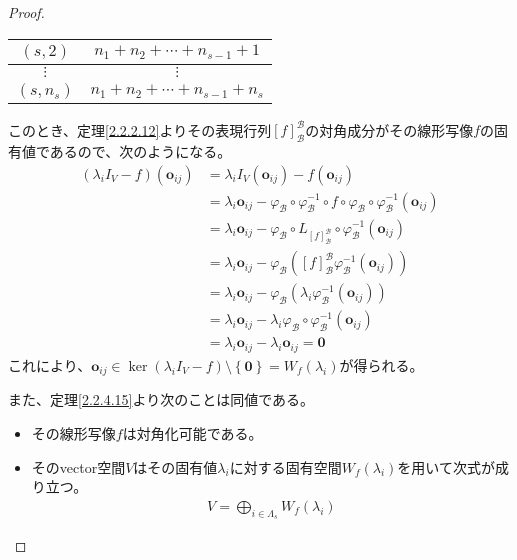 \documentclass[dvipdfmx]{jsarticle}
\begin{document}
\begin{proof}
\begin{longtable}[c]{|c|c|}
  \hline
  $(s,2)$ & $n_{1} + n_{2} + \cdots + n_{s - 1} + 1$ \\
  \hline
  $\vdots$ & $\vdots$ \\
  \hline
  $\left( s,n_{s} \right)$ & $n_{1} + n_{2} + \cdots + n_{s - 1} + n_{s}$ \\
  \hline
\end{longtable}
このとき、定理\ref{2.2.2.12}よりその表現行列$[ f]_{\mathcal{B}}^{\mathcal{B}}$の対角成分がその線形写像$f$の固有値であるので、次のようになる。
\begin{align*}
\left( \lambda_{i}I_{V} - f \right)\left( \mathbf{o}_{ij} \right) &= \lambda_{i}I_{V}\left( \mathbf{o}_{ij} \right) - f\left( \mathbf{o}_{ij} \right)\\
&= \lambda_{i}\mathbf{o}_{ij} - \varphi_{\mathcal{B}} \circ \varphi_{\mathcal{B}}^{- 1} \circ f \circ \varphi_{\mathcal{B}} \circ \varphi_{\mathcal{B}}^{- 1}\left( \mathbf{o}_{ij} \right)\\
&= \lambda_{i}\mathbf{o}_{ij} - \varphi_{\mathcal{B}} \circ L_{[ f]_{\mathcal{B}}^{\mathcal{B}}} \circ \varphi_{\mathcal{B}}^{- 1}\left( \mathbf{o}_{ij} \right)\\
&= \lambda_{i}\mathbf{o}_{ij} - \varphi_{\mathcal{B}}\left( [ f]_{\mathcal{B}}^{\mathcal{B}}\varphi_{\mathcal{B}}^{- 1}\left( \mathbf{o}_{ij} \right) \right)\\
&= \lambda_{i}\mathbf{o}_{ij} - \varphi_{\mathcal{B}}\left( \lambda_{i}\varphi_{\mathcal{B}}^{- 1}\left( \mathbf{o}_{ij} \right) \right)\\
&= \lambda_{i}\mathbf{o}_{ij} - \lambda_{i}\varphi_{\mathcal{B}} \circ \varphi_{\mathcal{B}}^{- 1}\left( \mathbf{o}_{ij} \right)\\
&= \lambda_{i}\mathbf{o}_{ij} - \lambda_{i}\mathbf{o}_{ij} = \mathbf{0}
\end{align*}
これにより、$\mathbf{o}_{ij} \in \ker\left( \lambda_{i}I_{V} - f \right) \setminus \left\{ \mathbf{0} \right\} = W_{f}\left( \lambda_{i} \right)$が得られる。\par
また、定理\ref{2.2.4.15}より次のことは同値である。
\begin{itemize}
\item
  その線形写像$f$は対角化可能である。
\item
  そのvector空間$V$はその固有値$\lambda_{i}$に対する固有空間$W_{f}\left( \lambda_{i} \right)$を用いて次式が成り立つ。
\begin{align*}
V = \bigoplus_{i \in \varLambda_{s}} {W_{f}\left( \lambda_{i} \right)}
\end{align*}

\end{itemize}
\end{proof}
\end{document}
